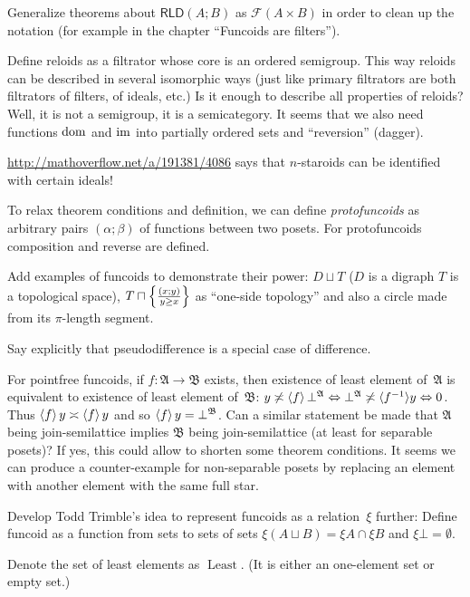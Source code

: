 \documentclass{amsart}
\begin{document}
Generalize theorems about $\mathsf{RLD}(A;B)$ as $\mathscr{F}(A\times B)$ in order to clean up the notation
(for example in the chapter ``Funcoids are filters'').

Define reloids as a filtrator whose core is an ordered semigroup.
This way reloids can be described in several isomorphic ways (just like primary filtrators are both filtrators of filters, of ideals, etc.)
Is it enough to describe all properties of reloids? Well, it is not a semigroup, it is a semicategory.
It seems that we also need functions $\operatorname{dom}$ and $\operatorname{im}$ into partially ordered sets and ``reversion'' (dagger).

\url{http://mathoverflow.net/a/191381/4086} says that $n$-staroids can be identified with certain ideals!

To relax theorem conditions and definition, we can define \emph{protofuncoids} as arbitrary pairs $(\alpha;\beta)$ of functions
between two posets. For protofuncoids composition and reverse are defined.

Add examples of funcoids to demonstrate their power:
$D\sqcup T$ ($D$ is a digraph $T$ is a topological space),
$T\sqcap\left\{ \frac{(x;y)}{y\ge x}\right\}$ as ``one-side topology'' and also a circle made from its $\pi$-length segment.

Say explicitly that pseudodifference is a special case of difference.

For pointfree funcoids, if $f:\mathfrak{A}\rightarrow\mathfrak{B}$ exists,
then existence of least element of~$\mathfrak{A}$ is equivalent to existence of least element of~$\mathfrak{B}$:
$y \not\asymp \left\langle f\right\rangle \bot^{\mathfrak{A}} \Leftrightarrow
\bot^{\mathfrak{A}} \not\asymp \langle f^{- 1} \rangle y \Leftrightarrow 0$. Thus
$\left\langle f\right\rangle y \asymp \left\langle f\right\rangle y$ and so $\left\langle f\right\rangle y =
\bot^{\mathfrak{B}}$.
Can a similar statement be made that $\mathfrak{A}$ being join-semilattice implies $\mathfrak{B}$ being join-semilattice
(at least for separable posets)? If yes, this could allow to shorten some theorem conditions.
It seems we can produce a counter-example for non-separable posets by replacing an element with another element with the same full star.

Develop Todd Trimble's idea to represent funcoids as a relation~$\xi$ further:
Define funcoid as a function from sets to sets of sets
$\xi(A\sqcup B) = \xi A\cap\xi B$ and $\xi\bot=\emptyset$.

Denote the set of least elements as $\operatorname{Least}$. (It is either an
one-element set or empty set.)
\end{document}
